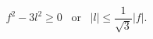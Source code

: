 \begin{equation}
f^2-3l^2 \geqslant 0
\,\,\,\,\, \mathrm{or} \,\,\,\,\,
|l| \leqslant \frac{1}{\sqrt{3}}|f|.   
\end{equation}

